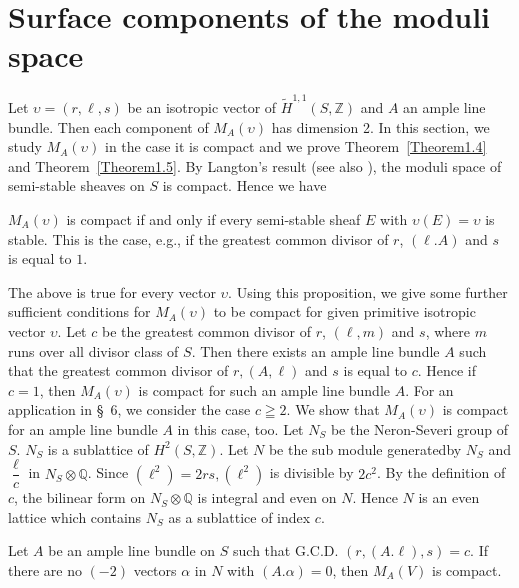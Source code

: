 \section{Surface components of the moduli space}\label{s4}\pageoriginale

Let $\upsilon=(r,\ell,s)$ be an isotropic vector of
$\widetilde{H}^{1,1}(S,\mathbb{Z})$ and $A$ an ample line bundle. Then
each component of $M_A(\upsilon)$ has dimension 2. In this section, we
study $M_A(\upsilon)$ in the case it is compact and we prove
Theorem~\ref{Theorem1.4} and Theorem~\ref{Theorem1.5}. By Langton's
result \cite{key6} (see also \cite[\S\ 5]{key9}), the moduli space of
semi-stable sheaves on $S$ is compact. Hence we have 


\begin{Prop}\label{Prop4.1}
$M_A(\upsilon)$ is compact if and only if every semi-stable sheaf $E$
with $\upsilon(E)=\upsilon$ is stable. This is the case, e.g., if the
greatest common divisor of $r$, $(\ell. A)$ and $s$ is equal to $1$.
\end{Prop}

The above is true for every vector $\upsilon$. Using this proposition,
we give some further sufficient conditions for $M_A(\upsilon)$ to be
compact for given primitive isotropic vector $\upsilon$. Let $c$ be
the greatest common divisor of $r$, $(\ell, m)$ and $s$, where $m$
runs over all divisor class of $S$. Then there exists an ample line
bundle $A$ such that the greatest common divisor of $r,(A,\ell)$ and
$s$ is equal to $c$. Hence if $c=1$, then $M_A(\upsilon)$ is compact
for such an ample line bundle $A$. For an application in \S\ 6, we
consider the case $c\geqq 2$. We show that $M_A(\upsilon)$ is compact
for an ample line bundle $A$ in this case, too. Let $N_S$ be the
Neron-Severi group of $S$. $N_S$ is a sublattice of
$H^{2}(S,\mathbb{Z})$. Let $N$ be the sub module generated\pageoriginale by $N_S$
and $\dfrac{\ell}{c}$ in $N_S\otimes \mathbb{Q}$. Since
$\left(\ell^{2}\right)=2rs,\left(\ell^{2}\right)$ is divisible by
$2c^{2}$. By the definition of $c$, the bilinear form on
$N_S\otimes \mathbb{Q}$ is integral and even on $N$. Hence $N$ is an
even lattice which contains $N_S$ as a sublattice of index $c$. 

\begin{Prop}\label{Prop4.2}
Let $A$ be an ample line bundle  on $S$ such that G.C.D. $(r,
(A.\ell), s)=c$. If there are no $(-2)$ vectors $\alpha$ in $N$ with
$(A.\alpha)=0$, then $M_A(V)$ is compact.
\end{Prop}

